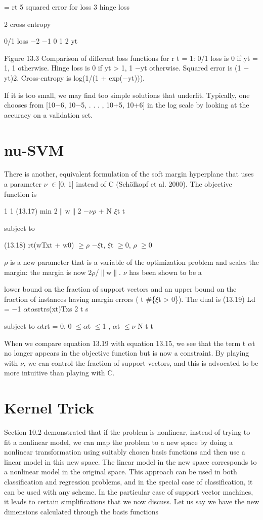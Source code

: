 = rt 5 squared error for loss 3 hinge loss

2 cross entropy

0/1 loss $-$2 $-$1 0 1 2 yt

Figure 13.3 Comparison of different loss functions for r t = 1: 0/1 loss is 0 if yt = 1, 1 otherwise. Hinge loss is 0 if yt > 1, 1 $-$yt otherwise. Squared error is (1 $-$yt)2. Cross-entropy is log(1/(1 + exp($-$yt))).

If it is too small, we may find too simple solutions that underfit. Typically, one chooses from [10$-$6, 10$-$5, . . . , 10+5, 10+6] in the log scale by looking at the accuracy on a validation set.

\section{nu-SVM}

There is another, equivalent formulation of the soft margin hyperplane that uses a parameter $\nu$ $\in$[0, 1] instead of C (Schölkopf et al. 2000). The objective function is

1 1 (13.17) min 2$\parallel$w$\parallel$2 $-$$\nu$$\rho$ + N $\xi$t t

subject to

(13.18) rt(wTxt + w0) $\geq$$\rho$ $-$$\xi$t, $\xi$t $\geq$0, $\rho$ $\geq$0

$\rho$ is a new parameter that is a variable of the optimization problem and scales the margin: the margin is now 2$\rho$/$\parallel$w$\parallel$. $\nu$ has been shown to be a

lower bound on the fraction of support vectors and an upper bound on the fraction of instances having margin errors ( t \#\{$\xi$t > 0\}). The dual is (13.19) Ld = $-$1 $\alpha$t$\alpha$srtrs(xt)Txs 2 t s

subject to $\alpha$trt = 0, 0 $\leq$$\alpha$t $\leq$1 , $\alpha$t $\leq$$\nu$ N t t

When we compare equation 13.19 with equation 13.15, we see that the term t $\alpha$t no longer appears in the objective function but is now a constraint. By playing with $\nu$, we can control the fraction of support vectors, and this is advocated to be more intuitive than playing with C.

\section{Kernel Trick}

Section 10.2 demonstrated that if the problem is nonlinear, instead of trying to fit a nonlinear model, we can map the problem to a new space by doing a nonlinear transformation using suitably chosen basis functions and then use a linear model in this new space. The linear model in the new space corresponds to a nonlinear model in the original space. This approach can be used in both classification and regression problems, and in the special case of classification, it can be used with any scheme. In the particular case of support vector machines, it leads to certain simplifications that we now discuss. Let us say we have the new dimensions calculated through the basis functions

